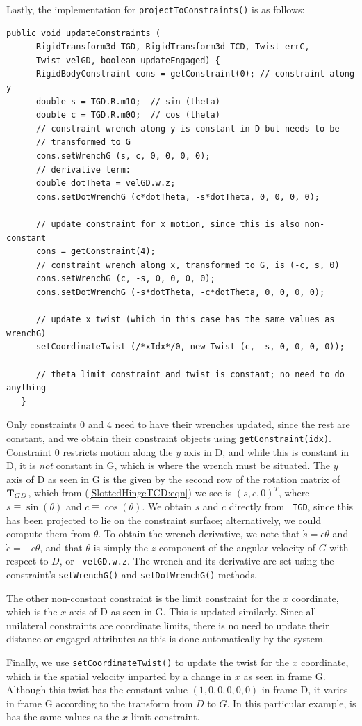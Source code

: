 Lastly, the implementation for {\tt projectToConstraints()} is as
follows:
%
\begin{lstlisting}[]
   public void updateConstraints (
      RigidTransform3d TGD, RigidTransform3d TCD, Twist errC,
      Twist velGD, boolean updateEngaged) {
      RigidBodyConstraint cons = getConstraint(0); // constraint along y
      double s = TGD.R.m10;  // sin (theta)
      double c = TGD.R.m00;  // cos (theta)
      // constraint wrench along y is constant in D but needs to be
      // transformed to G
      cons.setWrenchG (s, c, 0, 0, 0, 0);
      // derivative term:
      double dotTheta = velGD.w.z;
      cons.setDotWrenchG (c*dotTheta, -s*dotTheta, 0, 0, 0, 0);
      
      // update constraint for x motion, since this is also non-constant
      cons = getConstraint(4);
      // constraint wrench along x, transformed to G, is (-c, s, 0)
      cons.setWrenchG (c, -s, 0, 0, 0, 0);
      cons.setDotWrenchG (-s*dotTheta, -c*dotTheta, 0, 0, 0, 0);

      // update x twist (which in this case has the same values as wrenchG)
      setCoordinateTwist (/*xIdx*/0, new Twist (c, -s, 0, 0, 0, 0));

      // theta limit constraint and twist is constant; no need to do anything
   }
\end{lstlisting}
%
Only constraints 0 and 4 need to have their wrenches updated, since
the rest are constant, and we obtain their constraint objects using
{\tt getConstraint(idx)}. Constraint 0 restricts motion along the $y$
axis in D, and while this is constant in D, it is {\it not} constant
in G, which is where the wrench must be situated. The $y$ axis of D
as seen in G is the given by the second row of the rotation matrix of
${\bf T}_{GD}$, which from (\ref{SlottedHingeTCD:eqn}) we see is
$(s, c, 0)^T$, where $s \equiv \sin(\theta)$ and
$c \equiv \cos(\theta)$.  We obtain $s$ and $c$ directly from {\tt
TGD}, since this has been projected to lie on the constraint surface;
alternatively, we could compute them from $\theta$. To obtain the
wrench derivative, we note that $\dot s = c \dot\theta$ and
$\dot c = -c \dot\theta$, and that $\dot\theta$ is simply the $z$
component of the angular velocity of $G$ with respect to $D$, or {\tt
velGD.w.z}. The wrench and its derivative are set using the
constraint's {\tt setWrenchG()} and {\tt setDotWrenchG()} methods.

The other non-constant constraint is the limit constraint for the $x$
coordinate, which is the $x$ axis of D as seen in G. This is updated
similarly. Since all unilateral constraints are coordinate limits, there is no
need to update their {\sf distance} or {\sf engaged} attributes as this is done
automatically by the system.

Finally, we use {\tt setCoordinateTwist()} to update the twist for the $x$
coordinate, which is the spatial velocity imparted by a change in $x$ as seen
in frame G. Although this twist has the constant value $(1, 0, 0, 0, 0, 0)$ in
frame D, it varies in frame G according to the transform from $D$ to $G$.  In
this particular example, is has the same values as the $x$ limit constraint.

\ifdefined\maindoc
\else

\fi
